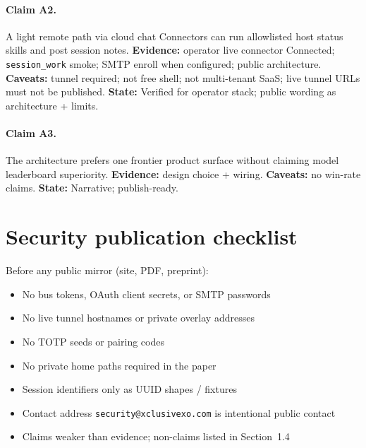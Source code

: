 \documentclass[11pt,a4paper]{article}
\begin{document}
\paragraph{Claim A2.}
A light remote path via cloud chat Connectors can run allowlisted host status
skills and post session notes.
\textbf{Evidence:} operator live connector Connected; \texttt{session\_work} smoke;
SMTP enroll when configured; public architecture.
\textbf{Caveats:} tunnel required; not free shell; not multi-tenant SaaS; live
tunnel URLs must not be published.
\textbf{State:} Verified for operator stack; public wording as architecture + limits.

\paragraph{Claim A3.}
The architecture prefers one frontier product surface without claiming model
leaderboard superiority.
\textbf{Evidence:} design choice + wiring.
\textbf{Caveats:} no win-rate claims.
\textbf{State:} Narrative; publish-ready.

\section{Security publication checklist}
\label{app:sec}

Before any public mirror (site, PDF, preprint):

\begin{itemize}[leftmargin=*]
  \item[$\checkmark$] No bus tokens, OAuth client secrets, or SMTP passwords
  \item[$\checkmark$] No live tunnel hostnames or private overlay addresses
  \item[$\checkmark$] No TOTP seeds or pairing codes
  \item[$\checkmark$] No private home paths required in the paper
  \item[$\checkmark$] Session identifiers only as UUID shapes / fixtures
  \item[$\checkmark$] Contact address \texttt{security@xclusivexo.com} is intentional public contact
  \item[$\checkmark$] Claims weaker than evidence; non-claims listed in Section~1.4
\end{itemize}
\end{document}
